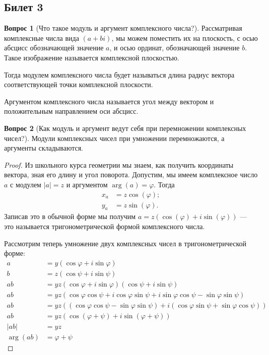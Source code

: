 \documentclass[a4paper,11pt]{article}
\theoremstyle{remark}
\theoremstyle{definition}
\newtheorem{question}{Вопрос}
\numberwithin{question}{subsection}
\begin{document}
\subsection{Билет 3}

\begin{question}[Что такое модуль и аргумент комплексного числа?]
Рассматривая комплексные числа вида \((a + bi)\), мы можем поместить их на плоскость, с осью абсцисс обозначающей значение \(a\), и осью ординат, обозначающей значение \(b\). Такое изображение называется комплексной плоскостью.

Тогда модулем комплексного числа будет называться длина радиус вектора соответствующей точки комплексной плоскости.

Аргументом комплексного числа называется угол между вектором и положительным направлением оси абсцисс. 
\end{question}


\begin{question}[Как модуль и аргумент ведут себя при перемножении комплексных чисел?]
Модули комплексных чисел при умножении перемножаются, а аргументы складываются.
\begin{proof}
Из школьного курса геометрии мы знаем, как получить координаты вектора, зная его длину и угол поворота. Допустим, мы имеем комплексное число \(a\) с модулем \(|a| = z\) и аргументом \(\arg(a) = \varphi\). Тогда
\begin{align*}
	x_a &= z\cos(\varphi); \\
	y_a &= z\sin(\varphi).
\end{align*}
Записав это в обычной форме мы получим \(a = z(\cos(\varphi) + i\sin(\varphi))\) --- это называется тригонометрической формой комплексного числа.

Рассмотрим теперь умножение двух комплексных чисел в тригонометрической форме:
\begin{align*}
	a &= y(\cos\varphi + i\sin\varphi) \\
	b &= z(\cos\psi + i\sin\psi) \\
	ab &= yz(\cos\varphi + i\sin\varphi)(\cos\psi + i\sin\psi) \\
	ab &= yz(\cos\varphi\cos\psi + i\cos\varphi\sin\psi + i\sin\varphi\cos\psi - \sin\varphi\sin\psi) \\
	ab &= yz((\cos\varphi\cos\psi - \sin\varphi\sin\psi) + i(\cos\varphi\sin\psi + \sin\varphi\cos\psi)) \\
	ab &= yz(\cos(\varphi + \psi) + i\sin(\varphi + \psi)) \\
	|ab| &= yz \\
	\arg(ab) &= \varphi + \psi
\end{align*}
\end{proof}
\end{question}
\end{document}
